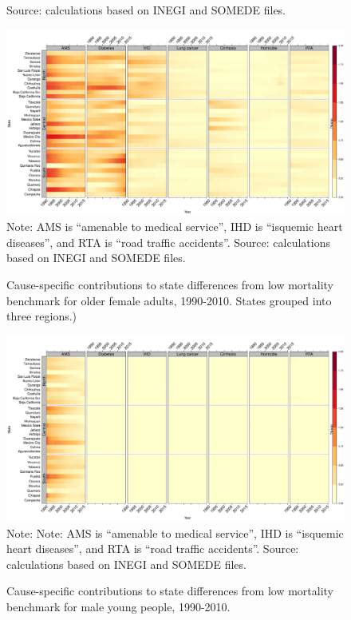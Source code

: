 \documentclass[11.5pt]{article}
\begin{document}
{\begin{figure}[h!]
 Source: calculations based on INEGI and SOMEDE files.
\end{figure}


\begin{figure}[h!]
\centering
\caption{Cause-specific contributions to state differences from low mortality benchmark for older female adults, 1990-2010. States grouped into three regions.)}
\label{fig:e40_74_females}
\includegraphics[scale=.31]{Adult_Female_heatmap.pdf}
Note: AMS is ``amenable to medical service'', IHD is ``isquemic heart diseases'', and RTA is ``road traffic accidents''. Source: calculations based on INEGI and SOMEDE files. \end{figure}


\begin{figure}
\centering
\caption{Cause-specific contributions to state differences from low mortality benchmark for male young people, 1990-2010.}
\label{fig:e0_14_males}
\includegraphics[scale=.3]{Young_Male_heatmap.pdf}
Note: Note: AMS is ``amenable to medical service'', IHD is ``isquemic heart diseases'', and RTA is ``road traffic accidents''. Source: calculations based on INEGI and SOMEDE files. \end{figure}

}
\end{document}

